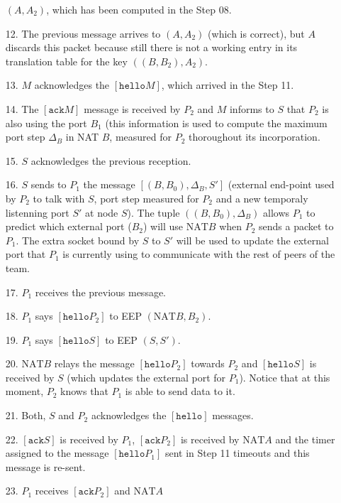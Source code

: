 \begin{itemize}
    $(A,A_2)$, which has been computed in the Step 08.
  \item [12.] The previous message arrives to $(A,A_2)$
    (which is correct), but $A$ discards this packet
    because still there is not a working entry in its translation
    table for the key
    $((B,B_2),A_2)$.
  \item [13.] $M$ acknowledges the $[\mathtt{hello} M]$, which arrived
    in the Step 11.
  \item [14.] The $[\mathtt{ack} M]$ message is received by $P_2$ and
    $M$ informs to $S$ that $P_2$ is also using the port $B_1$ (this
    information is used to compute the maximum port step $\Delta_B$
      in NAT $B$, measured for $P_2$ thoroughout its incorporation.
  \item [15.] $S$ acknowledges the previous reception.
  \item [16.] $S$ sends to $P_1$ the message $[(B,B_0),\Delta_B,S']$
    (external end-point used by $P_2$ to talk with $S$, port step
    measured for $P_2$ and a new temporaly listenning port
    $S'$ at node $S$). The tuple
    $((B,B_0),\Delta_B)$ allows $P_1$ to
    predict which external port ($B_2$) will use
    $\mathrm{NAT} B$ when $P_2$ sends a packet to $P_1$. The
    extra socket bound by $S$ to $S'$ will be used to update
    the external port that $P_1$ is currently using to communicate
    with the rest of peers of the team. %
  \item [17.] $P_1$ receives the previous message.
  \item [18.] $P_1$ says $[\mathtt{hello} P_2]$ to EEP
    $(\mathrm{NAT} B,B_2)$.
  \item [19.] $P_1$ says $[\mathtt{hello} S]$ to EEP $(S,S')$.
  \item [20.] $\mathrm{NAT} B$ relays the message
    $[\mathtt{hello} P_2]$ towards $P_2$ and $[\mathtt{hello} S]$ is
      received by $S$ (which updates the external port for
      $P_1$). Notice that at this moment, $P_2$ knows that $P_1$ is
      able to send data to it.
  \item [21.] Both, $S$ and $P_2$ acknowledges the $[\mathtt{hello}]$
    messages.
  \item [22.] $[\mathtt{ack} S]$ is received by $P_1$,
    $[\mathtt{ack} P_2]$ is received by $\mathrm{NAT} A$ and the timer
    assigned to the message $[\mathtt{hello} P_1]$ sent in Step 11
    timeouts and this message is re-sent.
  \item [23.] $P_1$ receives $[\mathtt{ack} P_2]$ and $\mathrm{NAT} A$

\end{itemize}
